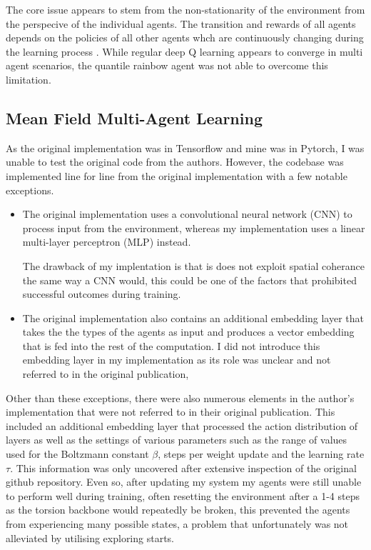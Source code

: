 The core issue appears to stem from the non-stationarity of
the environment from the perspecive of the individual agents.
The transition and rewards of all agents depends on the 
policies of all other agents whch are continuously changing
during the learning process \cite{Papoudakis2019}. While regular deep Q learning
appears to converge in multi agent scenarios, the
quantile rainbow agent was not able to overcome this limitation.


\subsection{Mean Field Multi-Agent Learning}
As the original implementation was in Tensorflow and
mine was in Pytorch, I was unable to test the original 
code from the authors. However, the codebase was
implemented line for line from the original 
implementation with a few notable exceptions.

\begin{itemize}
    \item The original implementation uses a convolutional
    neural network (CNN) to process input from the environment, whereas
    my implementation uses a linear multi-layer perceptron (MLP) instead.

    The drawback of my implentation is that is does not exploit
    spatial coherance the same way a CNN would, this could be one
    of the factors that prohibited successful outcomes during training.

    \item The original implementation also contains an additional
    embedding layer that takes the the types of the agents as input
    and produces a vector embedding that is fed into the rest of 
    the computation. I did not introduce this embedding layer
    in my implementation as its role was unclear and not referred 
    to in the original publication,
\end{itemize}

Other than these exceptions, there were also numerous elements
in the author's implementation that were not referred to in their original
publication. This included an additional embedding layer that
processed the action distribution of layers as well as the 
settings of various parameters such as the range of values used
for the Boltzmann constant $\beta$, steps per weight update and the
learning rate $\tau$. This information was only uncovered after
extensive inspection of the original github repository. 
Even so, after updating my system my agents were still unable
to perform well during training, often resetting the environment after
a 1-4 steps as the torsion backbone would repeatedly be broken,
this prevented the agents from experiencing many possible states,
a problem that unfortunately was not alleviated by utilising
exploring starts.

